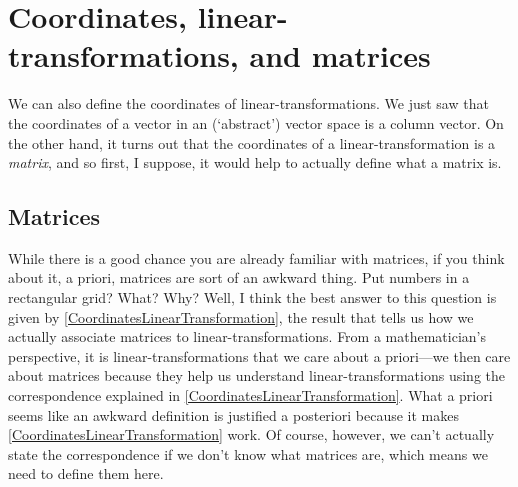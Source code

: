 \section{Coordinates, linear-transformations, and matrices}

We can also define the coordinates of linear-transformations.  We just saw that the coordinates of a vector in an (`abstract') vector space is a column vector.  On the other hand, it turns out that the coordinates of a linear-transformation is a \emph{matrix}, and so first, I suppose, it would help to actually define what a matrix is.

\subsection{Matrices}\label{sbs3.2.1}

While there is a good chance you are already familiar with matrices, if you think about it, a priori, matrices are sort of an awkward thing.  Put numbers in a rectangular grid?  What?  Why?  Well, I think the best answer to this question is given by \cref{CoordinatesLinearTransformation}, the result that tells us how we actually associate matrices to linear-transformations.  From a mathematician's perspective, it is linear-transformations that we care about a priori---we then care about matrices because they help us understand linear-transformations using the correspondence explained in \cref{CoordinatesLinearTransformation}.  What a priori seems like an awkward definition is justified a posteriori because it makes \cref{CoordinatesLinearTransformation} work.  Of course, however, we can't actually state the correspondence if we don't know what matrices are, which means we need to define them here.

